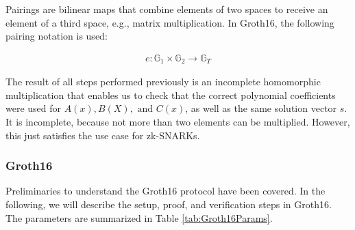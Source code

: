 Pairings are bilinear maps that combine elements of two spaces to receive an element of a third space, e.g., matrix multiplication. In Groth16, the following pairing notation is used:

\begin{align}
    e: \mathbb{G}_1 \times \mathbb{G}_2 \to \mathbb{G}_T
\end{align}

The result of all steps performed previously is an incomplete homomorphic multiplication that enables us to check that the correct polynomial coefficients were used for \(A(x), B(X), \text{ and }C(x)\), as well as the same solution vector \(s\). It is incomplete, because not more than two elements can be multiplied. However, this just satisfies the use case for zk-SNARKs. 

\subsubsection{Groth16}

Preliminaries to understand the Groth16 protocol have been covered. In the following, we will describe the setup, proof, and verification steps in Groth16. The parameters are summarized in Table \ref{tab:Groth16Params}.


